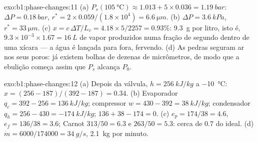 \begin{solution}{exo:b1:phase-changes:11}
(a) $P_s(\qty{105}{\degreeCelsius}) \approx 1.013 + 5 \times 0.036 = \qty{1.19}{bar}$:
$\Delta P = \qty{0.18}{bar}$, $r^\ast = 2 \times 0.059/(1.8 \times 10^4) = \qty{6.6}{\micro m}$.
(b) $\Delta P = \qty{3.6}{kPa}$, $r^\ast = \qty{33}{\micro m}$. (c) $x = c\,\Delta T/L_v =
4.18 \times 5/2257 = 0.93\%$: \qty{9.3}{g} por litro, isto é, $9.3 \times 10^{-3}
\times 1.67 = \qty{16}{L}$ de vapor produzidos numa fração de segundo dentro
de uma xícara --- a água é lançada para fora, fervendo. (d) As pedras seguram ar nos
seus poros: já existem bolhas de dezenas de micrômetros, de modo que a ebulição começa
assim que $P_s$ alcança $P_0$.
\end{solution}

\begin{solution}{exo:b1:phase-changes:12}
(a) Depois da válvula, $h = \qty{256}{kJ/kg}$ a \qty{-10}{\degreeCelsius}: $x =
(256 - 187)/(392 - 187) = 0.34$. (b) Evaporador $q_c = 392 - 256 =
\qty{136}{kJ/kg}$; compressor $w = 430 - 392 = \qty{38}{kJ/kg}$; condensador
$q_h = 256 - 430 = \qty{-174}{kJ/kg}$; $136 + 38 - 174 = 0$. (c) $e_p =
174/38 = 4.6$, $e_f = 136/38 = 3.6$; Carnot $313/50 = 6.3$ e $263/50 =
5.3$: cerca de $0.7$ do ideal. (d) $\dot m = 6000/174000 = \qty{34}{g/s}$,
\qty{2.1}{kg} por minuto.
\end{solution}

